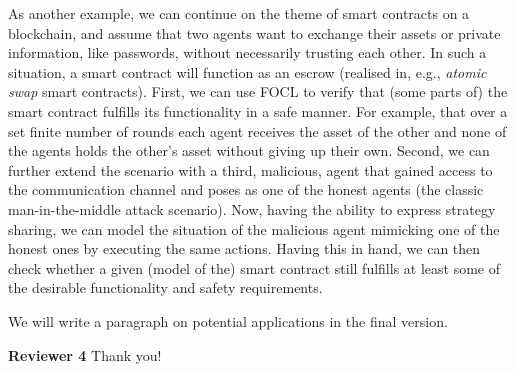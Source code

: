 \documentclass{article}
\begin{document}
As another example, we can continue on the theme of smart contracts on a blockchain, and assume that two agents want to exchange their assets or private information, like passwords, without necessarily trusting each other. In such a situation, a smart contract will function as an escrow (realised in, e.g., \textit{atomic swap} smart contracts). First, we can use FOCL to verify that (some parts of) the smart contract fulfills its functionality in a safe manner. For example, that over a set finite number of rounds each agent receives the asset of the other and none of the agents holds the other's asset without giving up their own. Second, we can further extend the scenario with a third, malicious, agent that gained access to the communication channel and poses as one of the honest agents (the classic man-in-the-middle attack scenario). Now, having the ability to express strategy sharing, we can model the situation of the malicious agent mimicking one of the honest ones by executing the same actions. Having this in hand, we can then check whether a given (model of the) smart contract still fulfills at least some of the desirable functionality and safety requirements. 

We will write a paragraph on potential applications in the final version.

\textbf{Reviewer 4} Thank you!
\end{document}
